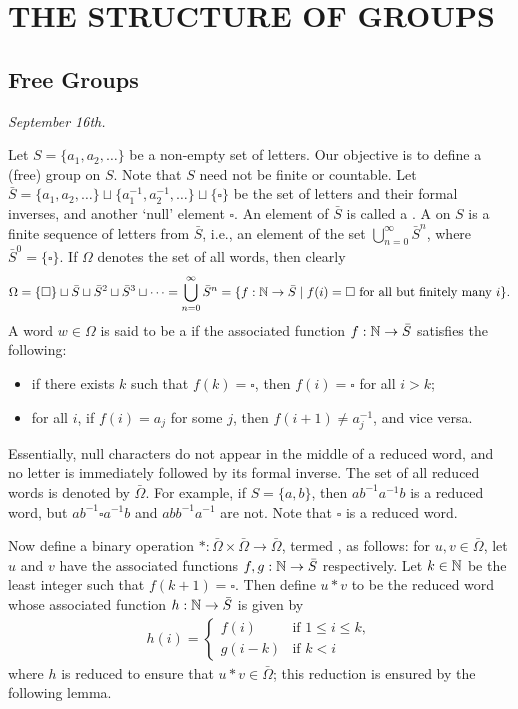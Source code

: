 \chapter{THE STRUCTURE OF GROUPS}


\section{Free Groups}

\textit{September 16th.}

Let $S = \{a_{1},a_{2},\ldots\}$ be a non-empty set of letters. Our objective is to define a (free) group on $S$. Note that $S$ need not be finite or countable. Let $\bar{S} = \{a_{1},a_{2},\ldots\} \sqcup \{a_{1}^{-1},a_{2}^{-1},\ldots\} \sqcup \{\square\}$ be the set of letters and their formal inverses, and another `null' element $\square$. An element of $\bar{S}$ is called a . A  on $S$ is a finite sequence of letters from $\bar{S}$, i.e., an element of the set $\bigcup_{n=0}^{\infty} \bar{S}^{n}$, where $\bar{S}^{0} = \{\square\}$. If $\Omega$ denotes the set of all words,
then clearly
\begin{align}
    \Omega = \{\square\} \sqcup \bar{S} \sqcup \bar{S}^{2} \sqcup \bar{S}^{3} \sqcup \cdots = \bigcup_{n=0}^{\infty} \bar{S}^{n} = \{f:\mathbb{N} \to \bar{S} \mid f(i) = \square \text{ for all but finitely many } i\}.
\end{align}
A word $w \in \Omega$ is said to be a  if the associated function $f:\mathbb{N} \to \bar{S}$ satisfies the following:
\begin{itemize}
    \item if there exists $k$ such that $f(k) = \square$, then $f(i) = \square$ for all $i > k$;
    \item for all $i$, if $f(i) = a_{j}$ for some $j$, then $f(i+1) \neq a_{j}^{-1}$, and vice versa.
\end{itemize}
Essentially, null characters do not appear in the middle of a reduced word, and no letter is immediately followed by its formal inverse. The set of all reduced words is denoted by $\bar{\Omega}$. For example, if $S = \{a,b\}$, then $ab^{-1}a^{-1}b$ is a reduced word, but $ab^{-1}\square a^{-1}b$ and $abb^{-1}a^{-1}$ are not. Note that $\square$ is a reduced word.

Now define a binary operation $\ast:\bar{\Omega}\times\bar{\Omega} \to \bar{\Omega}$, termed , as follows: for $u,v \in \bar{\Omega}$, let $u$ and $v$ have the associated functions $f,g:\mathbb{N} \to \bar{S}$ respectively. Let $k \in \mathbb{N}$ be the least integer such that $f(k+1) = \square$. Then define $u \ast v$ to be the reduced word whose associated function $h:\mathbb{N} \to \bar{S}$ is given by
\begin{align}
    h(i) = \begin{cases}
        f(i) & \text{if } 1 \leq i \leq k,\\
        g(i-k) & \text{if } k < i
    \end{cases}
\end{align}
where $h$ is reduced to ensure that $u \ast v \in \bar{\Omega}$; this reduction is ensured by the following lemma.

